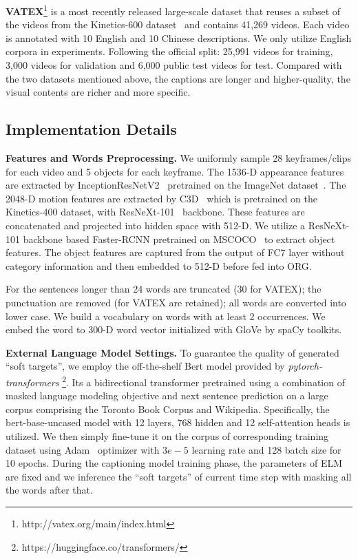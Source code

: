 \documentclass[10pt,twocolumn,letterpaper]{article}
\begin{document}
\textbf{VATEX}\footnote{http://vatex.org/main/index.html} is a most recently released large-scale dataset that reuses a subset of the videos from the Kinetics-600 dataset~\cite{Kay2017} and contains 41,269 videos. Each video is annotated with 10 English and 10 Chinese descriptions. We only utilize English corpora in experiments. Following the official split: 25,991 videos for training, 3,000 videos for validation and 6,000 public test videos for test. Compared with the two datasets mentioned above, the captions are longer and higher-quality, the visual contents are richer and more specific.

\subsection{Implementation Details}


\textbf{Features and Words Preprocessing.} We uniformly sample 28 keyframes/clips for each video and 5 objects for each keyframe. The 1536-D appearance features are extracted by InceptionResNetV2~\cite{Szegedy2017} pretrained on the ImageNet dataset~\cite{Russakovsky2015}. The 2048-D motion features are extracted by C3D~\cite{Hara2018} which is pretrained on the Kinetics-400 dataset, with ResNeXt-101~\cite{Xie2017} backbone. These features are concatenated and projected into hidden space with 512-D. We utilize a ResNeXt-101 backbone based Faster-RCNN pretrained on MSCOCO~\cite{Chen2019a} to extract object features. The object features are captured from the output of FC7 layer without category information and then embedded to 512-D before fed into ORG.

For the sentences longer than 24 words are truncated (30 for VATEX); the punctuation are removed (for VATEX are retained); all words are converted into lower case. We build a vocabulary on words with at least 2 occurrences. We embed the word to 300-D word vector initialized with GloVe by spaCy toolkits.

\textbf{External Language Model Settings.} To guarantee the quality of generated ``soft targets'', we employ the off-the-shelf Bert model provided by \textit{pytorch-transformers} \footnote{https://huggingface.co/transformers/}. Its a bidirectional transformer pretrained using a combination of masked language modeling objective and next sentence prediction on a large corpus comprising the Toronto Book Corpus and Wikipedia. Specifically, the bert-base-uncased model with 12 layers, 768 hidden and 12 self-attention heads is utilized. We then simply fine-tune it on the corpus of corresponding training dataset using Adam~\cite{Kingma2015} optimizer with $3e-5$ learning rate and 128 batch size for 10 epochs. During the captioning model training phase, the parameters of ELM are fixed and we inference the ``soft targets'' of current time step with masking all the words after that.
\end{document}
